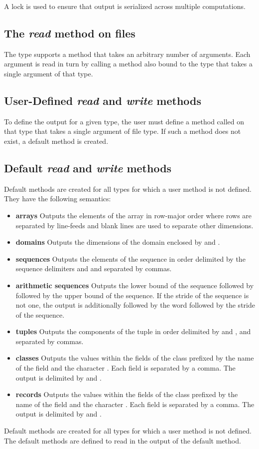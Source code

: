 A lock is used to ensure that output is serialized across multiple
computations.

\subsection{The {\em read} method on files}
\label{fileread}

The  type supports a method  that takes an
arbitrary number of arguments.  Each argument is read in turn by
calling a method also bound to the  type that takes a
single argument of that type.

\subsection{User-Defined {\em read} and {\em write} methods}

To define the output for a given type, the user must define a method
called  on that type that takes a single argument of file
type.  If such a method does not exist, a default method is created.

\subsection{Default {\em read} and {\em write} methods}

Default  methods are created for all types for which a user
 method is not defined.  They have the following semantics:
\begin{itemize}
\item
{\bf arrays} Outputs the elements of the array in row-major order
where rows are separated by line-feeds and blank lines are used to
separate other dimensions.
\item
{\bf domains} Outputs the dimensions of the domain enclosed
by \chpl{[} and \chpl{]}.
\item
{\bf sequences} Outputs the elements of the sequence in order
delimited by the sequence delimiters \chpl{(/} and \chpl{/)} and
separated by commas.
\item
{\bf arithmetic sequences} Outputs the lower bound of the sequence
followed by  followed by the upper bound of the sequence.  If
the stride of the sequence is not one, the output is additionally
followed by the word  followed by the stride of the sequence.
\item
{\bf tuples} Outputs the components of the tuple in order delimited
by \chpl{(} and \chpl{)}, and separated by commas.
\item
{\bf classes} Outputs the values within the fields of the class
prefixed by the name of the field and the character \chpl{=}.  Each
field is separated by a comma.  The output is delimited by \chpl{\{}
and \chpl{\}}.
\item
{\bf records} Outputs the values within the fields of the class
prefixed by the name of the field and the character \chpl{=}.  Each
field is separated by a comma.  The output is delimited by \chpl{(}
and \chpl{)}.
\end{itemize}

Default  methods are created for all types for which a user
 method is not defined.  The default  methods are
defined to read in the output of the default  method.
